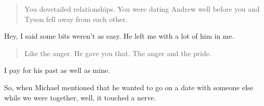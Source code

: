 \begin{quote}
You dovetailed relationships. You were dating Andrew well before you and Tyson fell away from each other.
\end{quote}

Hey, I said some bits weren't as easy. He left me with a lot of him in me.

\begin{quote}
Like the anger. He gave you that. The anger and the pride.
\end{quote}

I pay for his past as well as mine.

So, when Michael mentioned that he wanted to go on a date with someone else while we were together, well, it touched a nerve.
